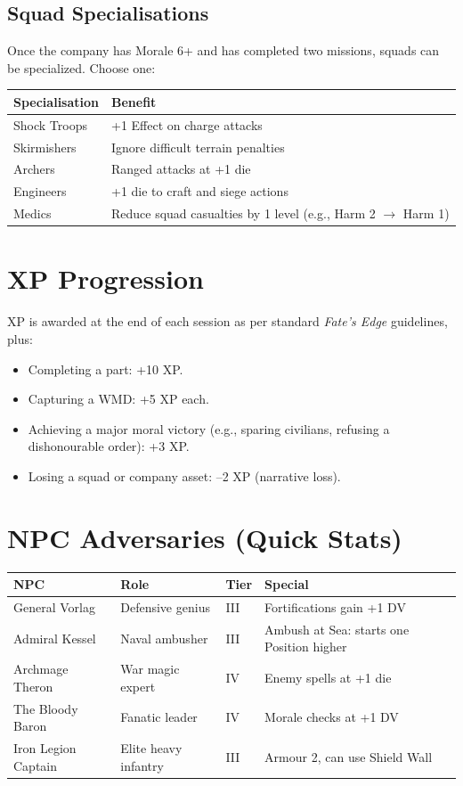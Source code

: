 \documentclass[11pt]{article}
\begin{document}
\subsection*{Squad Specialisations}
Once the company has Morale 6+ and has completed two missions, squads can be specialized. Choose one:

\begin{tabular}{@{}ll@{}}
\toprule
\textbf{Specialisation} & \textbf{Benefit}\\
\midrule
Shock Troops & +1 Effect on charge attacks\\
Skirmishers & Ignore difficult terrain penalties\\
Archers & Ranged attacks at +1 die\\
Engineers & +1 die to craft and siege actions\\
Medics & Reduce squad casualties by 1 level (e.g., Harm 2 $\rightarrow$ Harm 1)\\
\bottomrule
\end{tabular}

\section*{XP Progression}
XP is awarded at the end of each session as per standard \emph{Fate's Edge} guidelines, plus:

\begin{itemize}
\item Completing a part: +10 XP.
\item Capturing a WMD: +5 XP each.
\item Achieving a major moral victory (e.g., sparing civilians, refusing a dishonourable order): +3 XP.
\item Losing a squad or company asset: --2 XP (narrative loss).
\end{itemize}

\section*{NPC Adversaries (Quick Stats)}

\begin{tabular}{@{}llll@{}}
\toprule
\textbf{NPC} & \textbf{Role} & \textbf{Tier} & \textbf{Special}\\
\midrule
General Vorlag & Defensive genius & III & Fortifications gain +1 DV\\
Admiral Kessel & Naval ambusher & III & Ambush at Sea: starts one Position higher\\
Archmage Theron & War magic expert & IV & Enemy spells at +1 die\\
The Bloody Baron & Fanatic leader & IV & Morale checks at +1 DV\\
Iron Legion Captain & Elite heavy infantry & III & Armour 2, can use Shield Wall\\
\bottomrule
\end{tabular}
\end{document}
